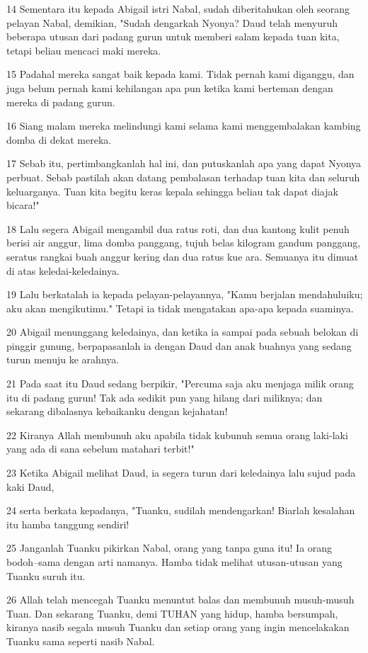 \par 14 Sementara itu kepada Abigail istri Nabal, sudah diberitahukan oleh seorang pelayan Nabal, demikian, "Sudah dengarkah Nyonya? Daud telah menyuruh beberapa utusan dari padang gurun untuk memberi salam kepada tuan kita, tetapi beliau mencaci maki mereka.
\par 15 Padahal mereka sangat baik kepada kami. Tidak pernah kami diganggu, dan juga belum pernah kami kehilangan apa pun ketika kami berteman dengan mereka di padang gurun.
\par 16 Siang malam mereka melindungi kami selama kami menggembalakan kambing domba di dekat mereka.
\par 17 Sebab itu, pertimbangkanlah hal ini, dan putuskanlah apa yang dapat Nyonya perbuat. Sebab pastilah akan datang pembalasan terhadap tuan kita dan seluruh keluarganya. Tuan kita begitu keras kepala sehingga beliau tak dapat diajak bicara!"
\par 18 Lalu segera Abigail mengambil dua ratus roti, dan dua kantong kulit penuh berisi air anggur, lima domba panggang, tujuh belas kilogram gandum panggang, seratus rangkai buah anggur kering dan dua ratus kue ara. Semuanya itu dimuat di atas keledai-keledainya.
\par 19 Lalu berkatalah ia kepada pelayan-pelayannya, "Kamu berjalan mendahuluiku; aku akan mengikutimu." Tetapi ia tidak mengatakan apa-apa kepada suaminya.
\par 20 Abigail menunggang keledainya, dan ketika ia sampai pada sebuah belokan di pinggir gunung, berpapasanlah ia dengan Daud dan anak buahnya yang sedang turun menuju ke arahnya.
\par 21 Pada saat itu Daud sedang berpikir, "Percuma saja aku menjaga milik orang itu di padang gurun! Tak ada sedikit pun yang hilang dari miliknya; dan sekarang dibalasnya kebaikanku dengan kejahatan!
\par 22 Kiranya Allah membunuh aku apabila tidak kubunuh semua orang laki-laki yang ada di sana sebelum matahari terbit!"
\par 23 Ketika Abigail melihat Daud, ia segera turun dari keledainya lalu sujud pada kaki Daud,
\par 24 serta berkata kepadanya, "Tuanku, sudilah mendengarkan! Biarlah kesalahan itu hamba tanggung sendiri!
\par 25 Janganlah Tuanku pikirkan Nabal, orang yang tanpa guna itu! Ia orang bodoh--sama dengan arti namanya. Hamba tidak melihat utusan-utusan yang Tuanku suruh itu.
\par 26 Allah telah mencegah Tuanku menuntut balas dan membunuh musuh-musuh Tuan. Dan sekarang Tuanku, demi TUHAN yang hidup, hamba bersumpah, kiranya nasib segala musuh Tuanku dan setiap orang yang ingin mencelakakan Tuanku sama seperti nasib Nabal.
